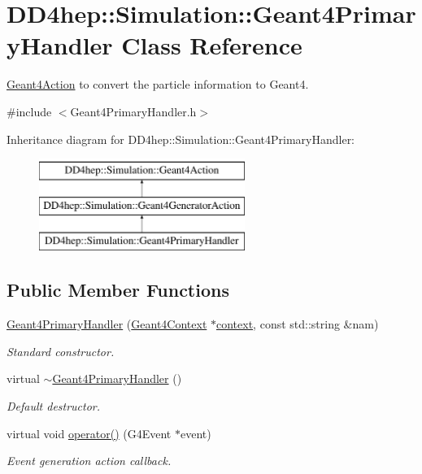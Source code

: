\hypertarget{class_d_d4hep_1_1_simulation_1_1_geant4_primary_handler}{}\section{D\+D4hep\+:\+:Simulation\+:\+:Geant4\+Primary\+Handler Class Reference}
\label{class_d_d4hep_1_1_simulation_1_1_geant4_primary_handler}


\hyperlink{class_d_d4hep_1_1_simulation_1_1_geant4_action}{Geant4\+Action} to convert the particle information to Geant4.  




{\ttfamily \#include $<$Geant4\+Primary\+Handler.\+h$>$}

Inheritance diagram for D\+D4hep\+:\+:Simulation\+:\+:Geant4\+Primary\+Handler\+:\begin{figure}[H]
\begin{center}
\leavevmode
\includegraphics[height=3.000000cm]{class_d_d4hep_1_1_simulation_1_1_geant4_primary_handler}
\end{center}
\end{figure}
\subsection*{Public Member Functions}
\begin{DoxyCompactItemize}
\item 
\hyperlink{class_d_d4hep_1_1_simulation_1_1_geant4_primary_handler_abc9c6880682a0ade66bdb15774e67180}{Geant4\+Primary\+Handler} (\hyperlink{class_d_d4hep_1_1_simulation_1_1_geant4_context}{Geant4\+Context} $\ast$\hyperlink{class_d_d4hep_1_1_simulation_1_1_geant4_action_aa9d87f0ec2a72b7fc2591b18f98d75cf}{context}, const std\+::string \&nam)
\begin{DoxyCompactList}\small\item\em Standard constructor. \end{DoxyCompactList}\item 
virtual \hyperlink{class_d_d4hep_1_1_simulation_1_1_geant4_primary_handler_aa559ec3b18b6663b07914aba80760212}{$\sim$\+Geant4\+Primary\+Handler} ()
\begin{DoxyCompactList}\small\item\em Default destructor. \end{DoxyCompactList}\item 
virtual void \hyperlink{class_d_d4hep_1_1_simulation_1_1_geant4_primary_handler_a54370e4749de14a101a248981f51864b}{operator()} (G4\+Event $\ast$event)
\begin{DoxyCompactList}\small\item\em Event generation action callback. \end{DoxyCompactList}\end{DoxyCompactItemize}

